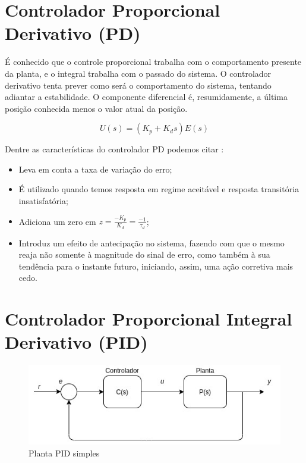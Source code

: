 \documentclass[
	12pt,				%
	openany,			%
	oneside,			%
	a4paper,			%
	english,			%
	french,				%
	spanish,			%
	brazil,				%
	]{abntex2}
\begin{document}
{\section{Controlador Proporcional Derivativo (PD)}

É conhecido que o controle proporcional trabalha com o comportamento presente da planta, e o integral trabalha com o passado do sistema. O controlador derivativo tenta prever como será o comportamento do sistema, tentando adiantar a estabilidade. O componente diferencial é, resumidamente, a última posição conhecida menos o valor atual da posição.

\begin{equation}
U(s) = (K_p + K_ds)E(s)
\end{equation}

Dentre as características do controlador PD podemos citar \cite{meneghetti1}:

\begin{itemize}
    \item Leva em conta a taxa de variação do erro;
    \item É utilizado quando temos resposta em regime aceitável e resposta transitória insatisfatória;
    \item Adiciona um zero em $z = \frac{-K_p}{K_d}= \frac{-1}{\tau_d}$;
    \item Introduz um efeito de antecipação no sistema, fazendo com que o mesmo reaja não somente à magnitude do sinal de erro, como também à sua tendência para o instante futuro, iniciando, assim, uma ação corretiva mais cedo.
\end{itemize}

\section{Controlador Proporcional Integral Derivativo (PID)}

\begin{figure}[h]
	\centering
	\includegraphics[scale=0.70]{planta.jpg}
	\caption{Planta PID simples}
\end{figure}

}
\end{document}
